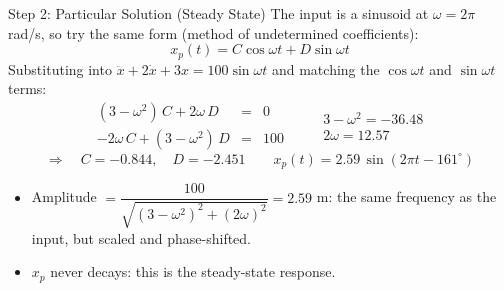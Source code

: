 \documentclass[12pt, aspectratio=169]{beamer}
\begin{document}
\begin{frame}{Step 2: Particular Solution (Steady State)}
    The input is a sinusoid at $\omega = 2\pi$ rad/s, so try the same form
    (\alert{method of undetermined coefficients}):
    \[
        x_p(t) = C\cos\omega t + D\sin\omega t
    \]
    Substituting into $\ddot{x} + 2\dot{x} + 3x = 100\sin\omega t$ and matching the
    $\cos\omega t$ and $\sin\omega t$ terms:
    \[
        \begin{array}{rcl}
            (3-\omega^2)\,C + 2\omega\,D &=& 0\\[2pt]
            -2\omega\,C + (3-\omega^2)\,D &=& 100
        \end{array}
        \qquad
        \begin{array}{l}
            3-\omega^2 = -36.48\\[2pt]
            2\omega = 12.57
        \end{array}
    \]
    \[
        \Longrightarrow\quad C = -0.844, \quad D = -2.451
        \qquad
        x_p(t) = 2.59\,\sin(2\pi t - 161^\circ)
    \]
    \begin{itemize}
        \item Amplitude $=\dfrac{100}{\sqrt{(3-\omega^2)^2 + (2\omega)^2}} = 2.59$ m:
              the same frequency as the input, but scaled and phase-shifted.
        \item $x_p$ never decays: this is the \alert{steady-state} response.
    \end{itemize}
\end{frame}
\end{document}
